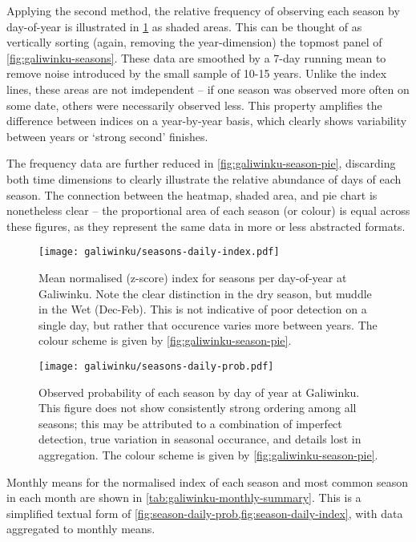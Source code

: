 Applying the second method, the relative frequency of observing each season
by day-of-year is illustrated in \cref{fig:season-daily-prob} as shaded areas.
This can be thought of as vertically sorting (again, removing the year-dimension)
the topmost panel of \cref{fig:galiwinku-seasons}.  These data are
smoothed by a 7-day running mean to remove noise introduced by the small sample
of 10-15 years.
%
Unlike the index lines, these areas are not imdependent -- if one season was
observed more often on some date, others were necessarily observed less.
This property amplifies the difference between indices on a year-by-year basis,
which clearly shows variability between years or `strong second' finishes.

The frequency data are further reduced in \cref{fig:galiwinku-season-pie},
discarding both time dimensions to clearly illustrate the relative abundance
of days of each season.  The connection between the heatmap, shaded area, and
pie chart is nonetheless clear -- the proportional area of each season
(or colour) is equal across these figures, as they represent the same data
in more or less abstracted formats.


\begin{figure}[p]
    \centering
    \texttt{[image: galiwinku/seasons-daily-index.pdf]}
    \caption[Season index by day-of-year, Galiwinku]{
        Mean normalised (z-score) index for seasons per day-of-year
        at Galiwinku.  Note the clear distinction in the dry season,
        but muddle in the Wet (Dec-Feb).
        This is not indicative of poor detection on a single day,
        but rather that occurence varies more between years.
        The colour scheme is given by \cref{fig:galiwinku-season-pie}.
        }
    \label{fig:season-daily-index}
\vspace{1cm}
    \texttt{[image: galiwinku/seasons-daily-prob.pdf]}
    \caption[Season probability by day-of-year, Galiwinku]{
        Observed probability of each season by day of year at Galiwinku.
        This figure does not show consistently strong ordering among all
        seasons; this may be attributed to a combination of imperfect
        detection, true variation in seasonal occurance, and details
        lost in aggregation.
        The colour scheme is given by \cref{fig:galiwinku-season-pie}.
        }
    \label{fig:season-daily-prob}
\end{figure}


\clearpage

Monthly means for the normalised index of each season and most common season
in each month are shown in \cref{tab:galiwinku-monthly-summary}.  This is
a simplified textual form of \cref{fig:season-daily-prob,fig:season-daily-index},
with data aggregated to monthly means.


